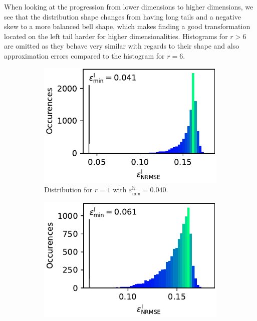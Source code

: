 \documentclass[
  a4paper,  %
  twoside,  %
  bibliography=totoc,
  headsepline,
  cleardoublepage=empty,
  parskip=half,
  draft=false
]{scrbook}
\begin{document}
When looking at the progression from lower dimensions to higher dimensions, we see that the distribution shape changes from having long tails and a negative skew to a more balanced bell shape, which makes finding a good transformation located on the left tail harder for higher dimensionalities.
Histograms for $r > 6$ are omitted as they behave very similar with regards to their shape and also approximation errors compared to the histogram for $r=6$.

\begin{mdframed}[style=style]
\begin{figure}[H]
  \centering
    \begin{subfigure}{.5\textwidth}
  \centering
   \includegraphics[width=0.95\linewidth]{graphics/ww_hist_1}
  \caption{Distribution for $r=1$ with $\varepsilon^\mathrm{h}_{\mathrm{min}}=0.040$.}
\vspace{3mm}
\label{fig:ishigami_hist_1}
\end{subfigure}%
\begin{subfigure}{.5\textwidth}
  \centering
   \includegraphics[width=0.95\linewidth]{graphics/ww_hist_2}

\end{subfigure}
\end{figure}
\end{mdframed}
\end{document}

